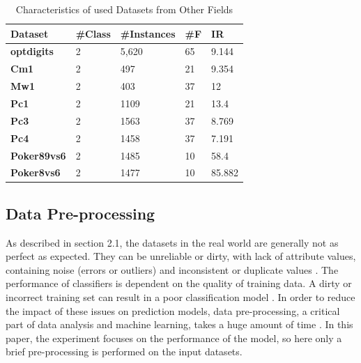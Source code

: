 \begin{table}[h]
    \centering
    \begin{tabular}{|p{}<{\centering}|p{}<{\centering}|p{}<{\centering}|p{}<{\centering}|p{}<{\centering}|}
    \hline
    \textbf{Dataset}        & \textbf{\#Class} & \textbf{\#Instances} & \textbf{\#F} & \textbf{IR} \\ \hline
    \textbf{optdigits}           & 2                & 5,620                & 65           & 9.144       \\ \hline
    \textbf{Cm1}            & 2                & 497                  & 21           & 9.354       \\ \hline
    \textbf{Mw1}            & 2                & 403                  & 37           & 12          \\ \hline
    \textbf{Pc1}            & 2                & 1109                 & 21           & 13.4        \\ \hline
    \textbf{Pc3}            & 2                & 1563                 & 37           & 8.769       \\ \hline
    \textbf{Pc4}            & 2                & 1458                 & 37           & 7.191       \\ \hline
    \textbf{Poker89vs6}     & 2                & 1485                 & 10           & 58.4        \\ \hline
    \textbf{Poker8vs6}      & 2                & 1477                 & 10           & 85.882      \\ \hline
    \end{tabular}
    \caption{Characteristics of used Datasets from Other Fields}
    \label{tab25}
\end{table}

\subsection{Data Pre-processing}
As described in section 2.1, the datasets in the real world are generally not as perfect as expected. They can be unreliable or dirty, with lack of attribute values, containing noise (errors or outliers) and inconsistent or duplicate values \cite{82}. The performance of classifiers is dependent on the quality of training data. A dirty or incorrect training set can result in a poor classification model \cite{81}. In order to reduce the impact of these issues on prediction models, data pre-processing, a critical part of data analysis and machine learning, takes a huge amount of time \cite{77}. In this paper, the experiment focuses on the performance of the model, so here only a brief pre-processing is performed on the input datasets.


